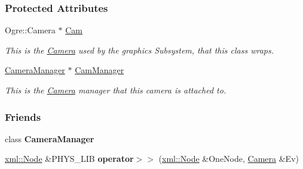 \subsubsection*{Protected Attributes}
\begin{DoxyCompactItemize}
\item 
\hypertarget{classphys_1_1Camera_a91622148b9b9a9ae1554c828f7e2fc89}{
Ogre::Camera $\ast$ \hyperlink{classphys_1_1Camera_a91622148b9b9a9ae1554c828f7e2fc89}{Cam}}
\label{classphys_1_1Camera_a91622148b9b9a9ae1554c828f7e2fc89}

\begin{DoxyCompactList}\small\item\em This is the \hyperlink{classphys_1_1Camera}{Camera} used by the graphics Subsystem, that this class wraps. \item\end{DoxyCompactList}\item 
\hypertarget{classphys_1_1Camera_a909203ede748deb1b587a8758ba8cec4}{
\hyperlink{classphys_1_1CameraManager}{CameraManager} $\ast$ \hyperlink{classphys_1_1Camera_a909203ede748deb1b587a8758ba8cec4}{CamManager}}
\label{classphys_1_1Camera_a909203ede748deb1b587a8758ba8cec4}

\begin{DoxyCompactList}\small\item\em This is the \hyperlink{classphys_1_1Camera}{Camera} manager that this camera is attached to. \item\end{DoxyCompactList}\end{DoxyCompactItemize}
\subsubsection*{Friends}
\begin{DoxyCompactItemize}
\item 
\hypertarget{classphys_1_1Camera_afae5bf9a900e8c5bc70c9332785e8465}{
class {\bfseries CameraManager}}
\label{classphys_1_1Camera_afae5bf9a900e8c5bc70c9332785e8465}

\item 
\hypertarget{classphys_1_1Camera_a903516ddc793b1d17d4d766a13bd6962}{
\hyperlink{classphys_1_1xml_1_1Node}{xml::Node} \&PHYS\_\-LIB {\bfseries operator$>$$>$} (\hyperlink{classphys_1_1xml_1_1Node}{xml::Node} \&OneNode, \hyperlink{classphys_1_1Camera}{Camera} \&Ev)}
\label{classphys_1_1Camera_a903516ddc793b1d17d4d766a13bd6962}

\end{DoxyCompactItemize}


